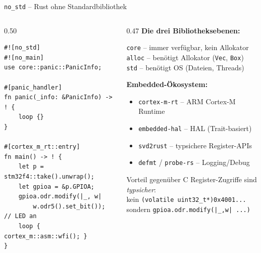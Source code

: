 \documentclass[%
  aspectratio=169,
  10pt
]{beamer}
\begin{document}
\begin{frame}[fragile]{\texttt{no\_std} -- Rust ohne Standardbibliothek}
  \begin{columns}[T]
    \begin{column}{0.50\textwidth}
\begin{lstlisting}
#![no_std]
#![no_main]
use core::panic::PanicInfo;

#[panic_handler]
fn panic(_info: &PanicInfo) -> ! {
    loop {}
}

#[cortex_m_rt::entry]
fn main() -> ! {
    let p = stm32f4::take().unwrap();
    let gpioa = &p.GPIOA;
    gpioa.odr.modify(|_, w|
        w.odr5().set_bit()); // LED an
    loop { cortex_m::asm::wfi(); }
}
\end{lstlisting}
    \end{column}
    \begin{column}{0.47\textwidth}
      \textbf{Die drei Bibliotheksebenen:}
      \begin{block}{}
        \small
        \texttt{core} -- immer verfügbar, kein Allokator\\
        \texttt{alloc} -- benötigt Allokator (\texttt{Vec}, \texttt{Box})\\
        \texttt{std} -- benötigt OS (Dateien, Threads)
      \end{block}
      \textbf{Embedded-Ökosystem:}
      \small
      \begin{itemize}
        \item \texttt{cortex-m-rt} -- ARM Cortex-M Runtime
        \item \texttt{embedded-hal} -- HAL (Trait-basiert)
        \item \texttt{svd2rust} -- typsichere Register-APIs
        \item \texttt{defmt} / \texttt{probe-rs} -- Logging/Debug
      \end{itemize}
      \begin{exampleblock}{Vorteil gegenüber C}
        \small Register-Zugriffe sind \emph{typsicher}:\\
        kein \texttt{(volatile uint32\_t*)0x4001...}\\
        sondern \texttt{gpioa.odr.modify(|\_,w| ...)}
      \end{exampleblock}
    \end{column}
  \end{columns}
\end{frame}
\end{document}
